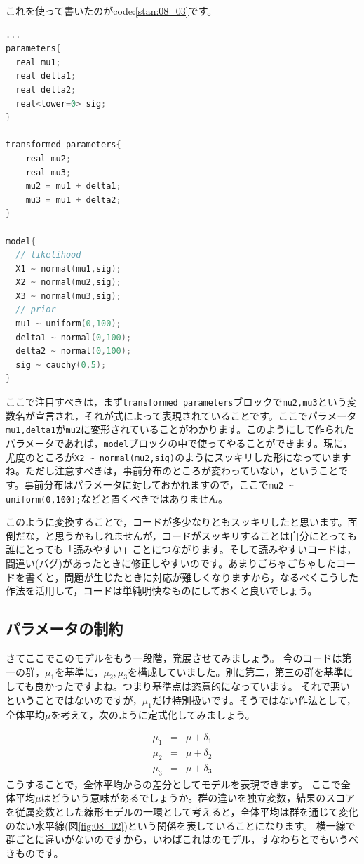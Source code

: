 \documentclass{ltjsbook}
\begin{document}
これを使って書いたのがcode:\ref{stan:08_03}です。
\begin{lstlisting}[language=C++,label={stan:08_03},caption={パラメータ変換を入れたコード}]
...
parameters{
  real mu1;
  real delta1;
  real delta2;
  real<lower=0> sig;
}

transformed parameters{
    real mu2;
    real mu3;
    mu2 = mu1 + delta1;
    mu3 = mu1 + delta2;
}

model{
  // likelihood
  X1 ~ normal(mu1,sig);
  X2 ~ normal(mu2,sig);
  X3 ~ normal(mu3,sig);
  // prior
  mu1 ~ uniform(0,100);
  delta1 ~ normal(0,100);
  delta2 ~ normal(0,100);
  sig ~ cauchy(0,5);
}

\end{lstlisting}
ここで注目すべきは，まず\verb|transformed parameters|ブロックで\verb|mu2,mu3|という変数名が宣言され，それが式によって表現されていることです。ここでパラメータ\verb|mu1,delta1|が\verb|mu2|に変形されていることがわかります。このようにして作られたパラメータであれば，\verb|model|ブロックの中で使ってやることができます。現に，尤度のところが\verb|X2 ~ normal(mu2,sig)|のようにスッキリした形になっていますね。ただし注意すべきは，事前分布のところが変わっていない，ということです。事前分布はパラメータに対しておかれますので，ここで\verb|mu2 ~ uniform(0,100);|などと置くべきではありません。

このように変換することで，コードが多少なりともスッキリしたと思います。面倒だな，と思うかもしれませんが，コードがスッキリすることは自分にとっても誰にとっても「読みやすい」ことにつながります。そして読みやすいコードは，間違い(バグ)があったときに修正しやすいのです。あまりごちゃごちゃしたコードを書くと，問題が生じたときに対応が難しくなりますから，なるべくこうした作法を活用して，コードは単純明快なものにしておくと良いでしょう。
\subsection{パラメータの制約}
さてここでこのモデルをもう一段階，発展させてみましょう。
今のコードは第一の群，$\mu_1$を基準に，$\mu_2,\mu_3$を構成していました。別に第二，第三の群を基準にしても良かったですよね。つまり基準点は恣意的になっています。
それで悪いということではないのですが，$\mu_1$だけ特別扱いです。そうではない作法として，全体平均$\mu$を考えて，次のように定式化してみましょう。

\begin{eqnarray}
	\mu_1 &=& \mu + \delta_1 \\
	\mu_2 &=& \mu + \delta_2 \\
	\mu_3 &=& \mu + \delta_3
\end{eqnarray}
こうすることで，全体平均からの差分としてモデルを表現できます。
ここで全体平均$\mu$はどういう意味があるでしょうか。群の違いを独立変数，結果のスコアを従属変数とした線形モデルの一環として考えると，全体平均は群を通じて変化のない水平線(図\ref{fig:08_02})という関係を表していることになります。
横一線で群ごとに違いがないのですから，いわばこれはのモデル，すなわちとでもいうべきものです。
\end{document}

